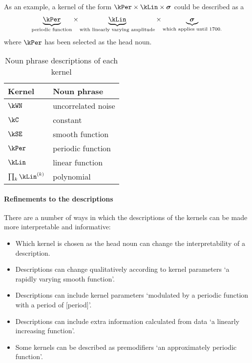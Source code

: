 As an example, a kernel of the form $\kPer \times  \kLin \times \boldsymbol{\sigma}$ could be described as a
\begin{align*}
\underbrace{\kPer}_{\textnormal{\scriptsize periodic function}} \times 
\underbrace{\kLin}_{\textnormal{\scriptsize with linearly varying amplitude}} \times 
\underbrace{\boldsymbol{\sigma}}_{\textnormal{\scriptsize which applies until 1700.}}
\end{align*}
where $\kPer$ has been selected as the head noun.

\begin{table}[ht]
\centering
\begin{tabular}{l|l}
Kernel & Noun phrase \\
\midrule
$\kWN$  & uncorrelated noise \\
$\kC$   & constant \\
$\kSE$  & smooth function \\
$\kPer$ & periodic function \\
$\kLin$ & linear function \\
$\prod_k \kLin^{(k)}$ & polynomial \\
\end{tabular}
\caption{
Noun phrase descriptions of each kernel
}
\label{table:nouns}
\end{table}

\paragraph{Refinements to the descriptions}

There are a number of ways in which the descriptions of the kernels can be made more interpretable and informative:
\begin{itemize}
  \item Which kernel is chosen as the head noun can change the interpretability of a description.
  \item Descriptions can change qualitatively according to kernel parameters \eg `a rapidly varying smooth function'.
  \item Descriptions can include kernel parameters \eg `modulated by a periodic function with a period of [period]'.
  \item Descriptions can include extra information calculated from data \eg `a linearly increasing function'.
  \item Some kernels can be described as premodifiers \eg `an approximately periodic function'.
\end{itemize}

